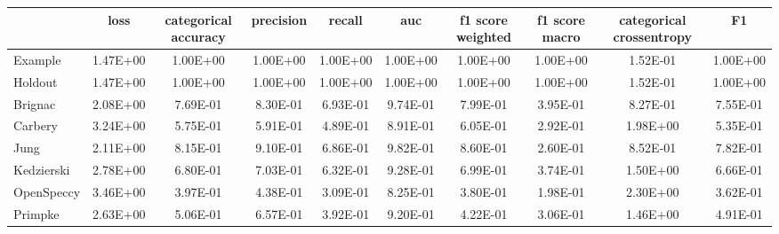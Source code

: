 \begin{tabular}{lccccccccc}
\toprule
 & loss & categorical accuracy & precision & recall & auc & f1 score weighted & f1 score macro & categorical crossentropy & F1 \\
\midrule
Example & 1.47E+00 & 1.00E+00 & 1.00E+00 & 1.00E+00 & 1.00E+00 & 1.00E+00 & 1.00E+00 & 1.52E-01 & 1.00E+00 \\
Holdout & 1.47E+00 & 1.00E+00 & 1.00E+00 & 1.00E+00 & 1.00E+00 & 1.00E+00 & 1.00E+00 & 1.52E-01 & 1.00E+00 \\
Brignac & 2.08E+00 & 7.69E-01 & 8.30E-01 & 6.93E-01 & 9.74E-01 & 7.99E-01 & 3.95E-01 & 8.27E-01 & 7.55E-01 \\
Carbery & 3.24E+00 & 5.75E-01 & 5.91E-01 & 4.89E-01 & 8.91E-01 & 6.05E-01 & 2.92E-01 & 1.98E+00 & 5.35E-01 \\
Jung & 2.11E+00 & 8.15E-01 & 9.10E-01 & 6.86E-01 & 9.82E-01 & 8.60E-01 & 2.60E-01 & 8.52E-01 & 7.82E-01 \\
Kedzierski & 2.78E+00 & 6.80E-01 & 7.03E-01 & 6.32E-01 & 9.28E-01 & 6.99E-01 & 3.74E-01 & 1.50E+00 & 6.66E-01 \\
OpenSpeccy & 3.46E+00 & 3.97E-01 & 4.38E-01 & 3.09E-01 & 8.25E-01 & 3.80E-01 & 1.98E-01 & 2.30E+00 & 3.62E-01 \\
Primpke & 2.63E+00 & 5.06E-01 & 6.57E-01 & 3.92E-01 & 9.20E-01 & 4.22E-01 & 3.06E-01 & 1.46E+00 & 4.91E-01 \\
\bottomrule
\end{tabular}
